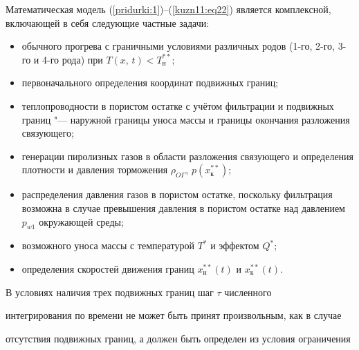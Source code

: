  Математическая модель (\ref{pridurki:1})--(\ref{kuzn11:eq22}) является комплексной, включающей в себя следующие частные задачи:



\begin{itemize}



\item[1)] обычного прогрева с граничными условиями различных родов (1-го, \mbox{2-го}, 3-го и 4-го рода) при $T(x,\,t)<T_\text{н}^{\ast \ast}$;



\item[2)] первоначального определения координат подвижных границ;



\item[3)] теплопроводности в пористом остатке с учётом фильтрации и подвижных границ "--- наружной границы уноса массы и границы окончания разложения связующего;



\item[4)] генерации пиролизных газов в области разложения связующего и определения плотности и давления торможения $\rho_{O \Gamma }$, $p (x_\text{к}^{\ast \ast} )$;



\item[5)] распределения давления газов в пористом остатке, поскольку фильтрация возможна в случае превышения давления в пористом остатке над давлением $p_{w1} $ окружающей среды;



\item[6)] возможного уноса массы с температурой $T^\ast $ и эффектом $Q^\ast$;



\item[7)] определения скоростей движения границ $x_\text{н}^{\ast \ast} (t)$ и $x_\text{к}^{\ast \ast} (t)$.



\end{itemize}



В условиях наличия трех подвижных границ шаг $\tau $ численного

интегрирования по времени не может быть принят произвольным, как в случае

отсутствия подвижных границ, а должен быть определен из условия ограничения

